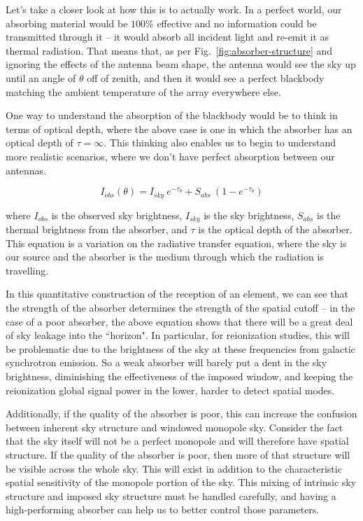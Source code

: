 Let's take a closer look at how this is to actually work. In a perfect world, 
our absorbing material would be $100\%$ effective and no information could be 
transmitted through it -- it would absorb all incident light and re-emit it as 
thermal radiation. That means that, as per Fig.~\ref{fig:absorber-structure} 
and ignoring the effects of the antenna beam shape, the antenna would see the 
sky up until an angle of $\theta$ off of zenith, and then it would see a 
perfect blackbody matching the ambient temperature of the array everywhere 
else.

One way to understand the absorption of the blackbody would be to think in 
terms of optical depth, where the above case is one in which the absorber has 
an optical depth of $\tau = \infty$. This thinking also enables us to begin to 
understand more realistic scenarios, where we don't have perfect absorption 
between our antennas.

\begin{equation}
    I_{obs}(\theta) = I_{sky}~e^{-\tau_\theta} + S_{abs}~(1 - e^{-\tau_\theta})
    \label{eq:abs-optical-depth}
\end{equation}

\noindent where $I_{obs}$ is the observed sky brightness, $I_{sky}$ is the sky 
brightness, $S_{abs}$ is the thermal brightness from the absorber, and $\tau$ 
is the optical depth of the absorber. This equation is a variation on the 
radiative transfer equation, where the sky is our source and the absorber is 
the medium through which the radiation is travelling.

In this quantitative construction of the reception of an element, we can see 
that the strength of the absorber determines the strength of the spatial cutoff 
-- in the case of a poor absorber, the above equation shows that there will be 
a great deal of sky leakage into the ``horizon". In particular, for 
reionization studies, this will be problematic due to the brightness of the sky 
at these frequencies from galactic synchrotron emission. So a weak absorber 
will barely put a dent in the sky brightness, diminishing the effectiveness of 
the imposed window, and keeping the reionization global signal power in the 
lower, harder to detect spatial modes.

Additionally, if the quality of the absorber is poor, this can increase the 
confusion between inherent sky structure and windowed monopole sky. Consider 
the fact that the sky itself will not be a perfect monopole and will therefore 
have spatial structure. If the quality of the absorber is poor, then more of 
that structure will be visible across the whole sky. This will exist in 
addition to the characteristic spatial sensitivity of the monopole portion of 
the sky. This mixing of intrinsic sky structure and imposed sky structure must 
be handled carefully, and having a high-performing absorber can help us to 
better control those parameters.

